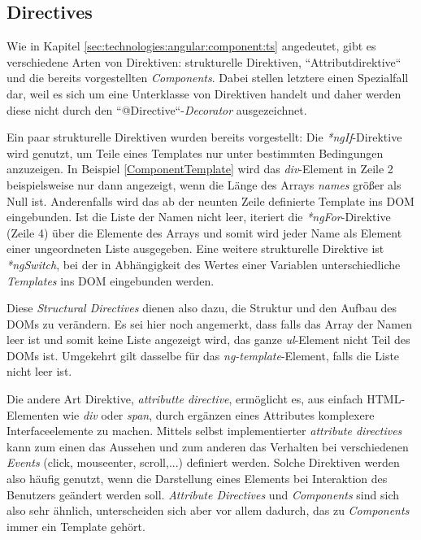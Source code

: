 \subsection{Directives}
\label{sec:technologies:angular:directive}

Wie in Kapitel \ref{sec:technologies:angular:component:ts} angedeutet, gibt es verschiedene Arten von Direktiven: strukturelle Direktiven, ``Attributdirektive`` und die bereits vorgestellten \textit{Components}. Dabei stellen letztere einen Spezialfall dar, weil es sich um eine Unterklasse von Direktiven handelt und daher werden diese nicht durch den ``@Directive``-\textit{Decorator} ausgezeichnet.

Ein paar strukturelle Direktiven wurden bereits vorgestellt: Die \textit{*ngIf}-Direktive wird genutzt, um Teile eines Templates nur unter bestimmten Bedingungen anzuzeigen. In Beispiel \ref{ComponentTemplate} wird das \textit{div}-Element in Zeile 2 beispielsweise nur dann angezeigt, wenn die Länge des Arrays \textit{names} größer als Null ist. Anderenfalls wird das ab der neunten Zeile definierte Template ins \acs{DOM} eingebunden. Ist die Liste der Namen nicht leer, iteriert die \textit{*ngFor}-Direktive (Zeile 4) über die Elemente des Arrays und somit wird jeder Name als Element einer ungeordneten Liste ausgegeben. Eine weitere strukturelle Direktive ist \textit{*ngSwitch}, bei der in Abhängigkeit des Wertes einer Variablen unterschiedliche \textit{Templates} ins \acs{DOM} eingebunden werden.

Diese \textit{Structural Directives} dienen also dazu, die Struktur und den Aufbau des \acsp{DOM} zu verändern. Es sei hier noch angemerkt, dass falls das Array der Namen leer ist und somit keine Liste angezeigt wird, das ganze \textit{ul}-Element nicht Teil des \acsp{DOM} ist. Umgekehrt gilt dasselbe für das \textit{ng-template}-Element, falls die Liste nicht leer ist\cite{StructuralDirectives}.

Die andere Art Direktive, \textit{attributte directive}, ermöglicht es, aus einfach \acs{HTML}-Elementen wie \textit{div} oder \textit{span}, durch ergänzen eines Attributes komplexere Interfaceelemente zu machen. Mittels selbst implementierter \textit{attribute directives} kann zum einen das Aussehen und zum anderen das Verhalten bei verschiedenen \textit{Events} (click, mouseenter, scroll,...) definiert werden\cite{AttributeDirectives}. Solche Direktiven werden also häufig genutzt, wenn die Darstellung eines Elements bei Interaktion des Benutzers geändert werden soll. \textit{Attribute Directives} und \textit{Components} sind sich also sehr ähnlich, unterscheiden sich aber vor allem dadurch, das zu \textit{Components} immer ein Template gehört.


